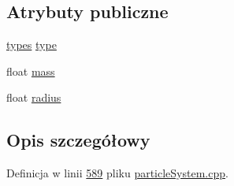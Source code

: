 \subsection*{Atrybuty publiczne}
\begin{DoxyCompactItemize}
\item 
\hyperlink{class_particle_system_1_1particle_type_a41677c7a6376be429aae198a3d6d0dcf}{types} \hyperlink{class_particle_system_1_1particle_type_aa28b152ee001a7797b9a308291a8c92a}{type}
\item 
float \hyperlink{class_particle_system_1_1particle_type_a7b31955f076be65f9bd704a23032597c}{mass}
\item 
float \hyperlink{class_particle_system_1_1particle_type_a262c51b90d7c71f897584e1584c22a41}{radius}
\end{DoxyCompactItemize}


\subsection{Opis szczegółowy}


Definicja w linii \hyperlink{particle_system_8cpp_source_l00589}{589} pliku \hyperlink{particle_system_8cpp_source}{particle\-System.\-cpp}.



